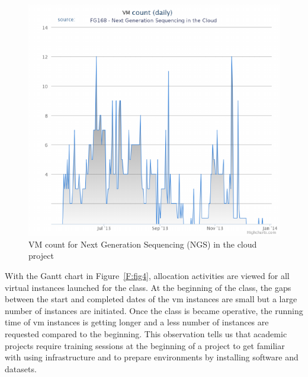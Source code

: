 \documentclass{sig-alternate-05-2015}
\begin{document}

\begin{figure}[h!] 
  \centering 
    \includegraphics[width=1.0\columnwidth]{images/fig2.pdf} 
  \caption{VM count for Next Generation Sequencing (NGS) in the cloud project}\label{F:fig3} 
\end{figure} 

With the Gantt chart in Figure~\ref{F:fig4}, allocation activities are viewed for all virtual instances launched for the class. At the beginning of the class, the gaps between the start and completed dates of the vm instances are small but a large number of instances are initiated. Once the class is became operative, the running time of vm instances is getting longer and a less number of instances are requested compared to the beginning. This observation tells us that academic projects require training sessions at the beginning of a project to get familiar with using infrastructure and to prepare environments by installing software and datasets.
\end{document}
